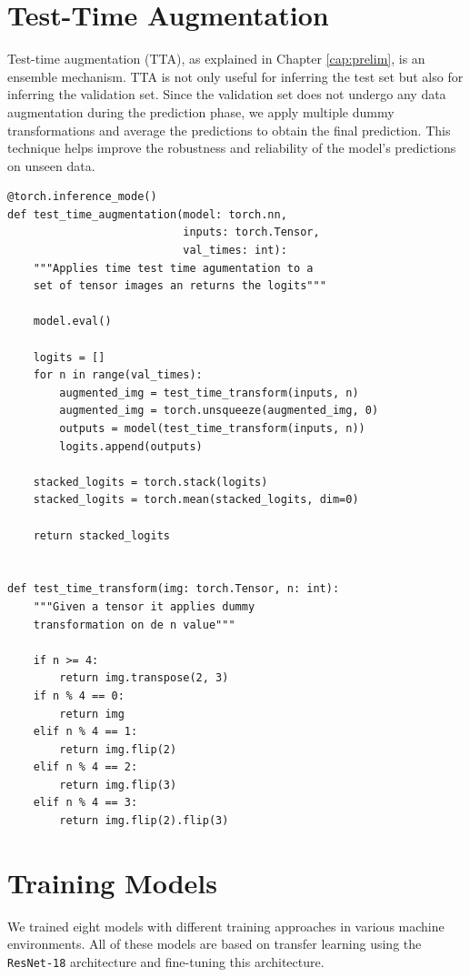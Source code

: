 \section{Test-Time Augmentation}

Test-time augmentation (TTA), as explained in Chapter \ref{cap:prelim}, is an ensemble mechanism. TTA is not only useful for inferring the test set but also for inferring the validation set. Since the validation set does not undergo any data augmentation during the prediction phase, we apply multiple dummy transformations and average the predictions to obtain the final prediction. This technique helps improve the robustness and reliability of the model's predictions on unseen data.

\begin{Verbatim}[fontsize=\small]
@torch.inference_mode()
def test_time_augmentation(model: torch.nn,
                           inputs: torch.Tensor,
                           val_times: int):
    """Applies time test time agumentation to a
    set of tensor images an returns the logits"""

    model.eval()

    logits = []
    for n in range(val_times):
        augmented_img = test_time_transform(inputs, n)
        augmented_img = torch.unsqueeze(augmented_img, 0)
        outputs = model(test_time_transform(inputs, n))
        logits.append(outputs)

    stacked_logits = torch.stack(logits)
    stacked_logits = torch.mean(stacked_logits, dim=0)

    return stacked_logits


def test_time_transform(img: torch.Tensor, n: int):
    """Given a tensor it applies dummy
    transformation on de n value"""

    if n >= 4:
        return img.transpose(2, 3)
    if n % 4 == 0:
        return img
    elif n % 4 == 1:
        return img.flip(2)
    elif n % 4 == 2:
        return img.flip(3)
    elif n % 4 == 3:
        return img.flip(2).flip(3)
\end{Verbatim}

\newpage

\section{Training Models}

We trained eight models with different training approaches in various machine environments. All of these models are based on transfer learning using the \texttt{ResNet-18} architecture and fine-tuning this architecture. \\

